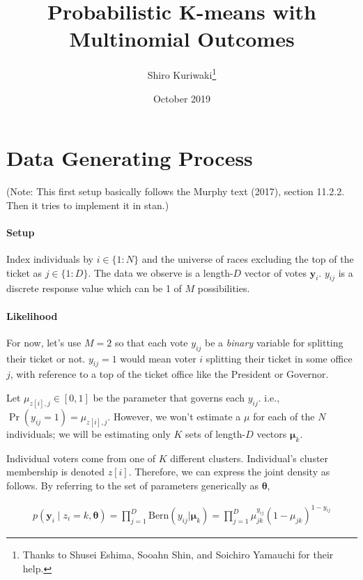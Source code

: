 \documentclass[12pt,letterpaper]{article}
\title{ \Large\textbf{Probabilistic K-means with Multinomial Outcomes}}
\author{\normalsize  Shiro
Kuriwaki\thanks{Thanks to Shusei Eshima, Sooahn Shin, and Soichiro Yamauchi for their help.} }
\date{\normalsize October 2019}
\numberwithin{equation}{section}
\newcommand{\bth}{\bm{\theta}}
\newcommand{\bmu}{\bm{\mu}}
\newcommand{\by}{\mathbf{y}}
\begin{document}
\maketitle



\section{Data Generating Process}

(Note: This first setup basically follows the Murphy text (2017),
section 11.2.2. Then it tries to implement it in stan.)

\paragraph{Setup}

Index individuals by \(i \in \{1:N\}\) and the universe of races
excluding the top of the ticket as \(j \in \{1:D\}\). The data we
observe is a length-\(D\) vector of votes \(\by_i\). \(y_{ij}\) is a
discrete response value which can be 1 of \(M\) possibilities.

\paragraph{Likelihood}

For now, let's use \(M = 2\) so that each vote \(y_{ij}\) be a
\emph{binary} variable for splitting their ticket or not. \(y_{ij} = 1\)
would mean voter \(i\) splitting their ticket in some office \(j\), with
reference to a top of the ticket office like the President or Governor.

Let \(\mu_{z[i], j} \in [0, 1]\) be the parameter that governs each
\(y_{ij}\). i.e., \(\Pr(y_{ij} = 1) = \mu_{z[i], j}.\) However, we won't
estimate a \(\mu\) for each of the \(N\) individuals; we will be
estimating only \(K\) sets of length-\(D\) vectors \(\bmu_{k}\).

Individual voters come from one of \(K\) different clusters.
Individual's cluster membership is denoted \(z[i]\). Therefore, we can
express the joint density as follows. By referring to the set of
parameters generically as \(\bth\),

\begin{align}
p(\by_{i} \mid z_{i} = k, \bth) = \prod^{D}_{j = 1} \text{Bern}(y_{ij} | \bmu_k) = \prod^{D}_{j = 1} \mu_{jk}^{y_{ij}}(1 - \mu_{jk})^{1 - y_{ij}}
\end{align}
\end{document}
